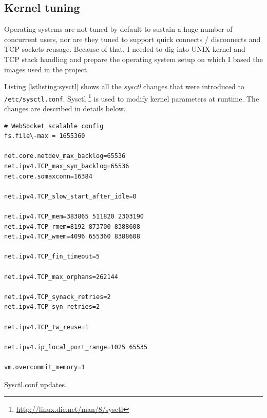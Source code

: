 \documentclass{uvamscse}
\begin{document}
\subsection{Kernel tuning}\label{Kernel tuning}
Operating systems are not tuned by default to sustain a huge number of concurrent users, nor are they tuned to support quick connects / disconnects and TCP sockets reusage. Because of that, I needed to dig into UNIX kernel and TCP stack handling and prepare the operating system setup on which I based the images used in the project.

Listing \ref{lstlisting:sysctl} shows all the \textit{sysctl} changes that were introduced to \texttt{/etc/sysctl.conf}. Sysctl \footnote{\url{http://linux.die.net/man/8/sysctl}} is used to modify kernel parameters at runtime. The changes are described in details below.

\begin{sourcecode}[h]
\begin{lstlisting}[style=mono]
# WebSocket scalable config
fs.file\-max = 1655360

net.core.netdev_max_backlog=65536
net.ipv4.TCP_max_syn_backlog=65536
net.core.somaxconn=16384

net.ipv4.TCP_slow_start_after_idle=0

net.ipv4.TCP_mem=383865 511820 2303190
net.ipv4.TCP_rmem=8192 873700 8388608
net.ipv4.TCP_wmem=4096 655360 8388608

net.ipv4.TCP_fin_timeout=5

net.ipv4.TCP_max_orphans=262144

net.ipv4.TCP_synack_retries=2
net.ipv4.TCP_syn_retries=2

net.ipv4.TCP_tw_reuse=1

net.ipv4.ip_local_port_range=1025 65535

vm.overcommit_memory=1
\end{lstlisting}
\caption{Sysctl.conf updates.}
\label{lstlisting:sysctl}
\end{sourcecode}
\end{document}
